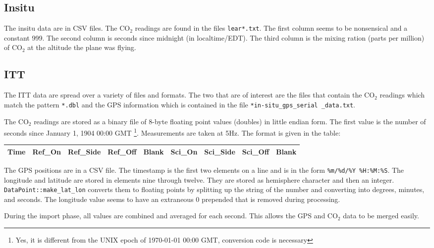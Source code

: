 \documentclass[12pt]{article}
\begin{document}
\subsection*{Insitu}

The insitu data are in CSV files. The CO$_2$ readings are found in the files \texttt{lear*.txt}.  The first column seems to be nonsensical and a constant 999.  The second column is seconds since midnight (in localtime/EDT).  The third column is the mixing ration (parts per million) of CO$_2$ at the altitude the plane was flying.

\subsection*{ITT}

The ITT data are spread over a variety of files and formats.  The two that are of interest are the files that contain the CO$_2$ readings which match the pattern \texttt{*.dbl} and the GPS information which is contained in the file \texttt{*in-situ\_gps\_serial \_data.txt}.

The CO$_2$ readings are stored as a binary file of 8-byte floating point values (doubles) in little endian form.  The first value is the number of seconds since January 1, 1904 00:00 GMT \footnote{Yes, it is different from the UNIX epoch of 1970-01-01 00:00 GMT, conversion code is necessary}. Measurements are taken at 5Hz. The format is given in the table:

\begin{center}
\begin{tabular}{|l|l|l|l|l|l|l|l|l|}
\hline 
Time & Ref\_On & Ref\_Side & Ref\_Off & Blank & Sci\_On & Sci\_Side & Sci\_Off & Blank \\
\hline
\end{tabular}
\end{center}

The GPS positions are in a CSV file.  The timestamp is the first two elements on a line and is in the form \texttt{\%m/\%d/\%Y \%H:\%M:\%S}.  The longitude and latitude are stored in elements nine through twelve.  They are stored as hemisphere character and then an integer.  \texttt{DataPoint::make\_lat\_lon} converts them to floating points by splitting up the string of the number and converting into degrees, minutes, and seconds. The longitude value seems to have an extraneous 0 prepended that is removed during processing.

During the import phase, all values are combined and averaged for each second.  This allows the GPS and CO$_2$ data to be merged easily.
\end{document}
